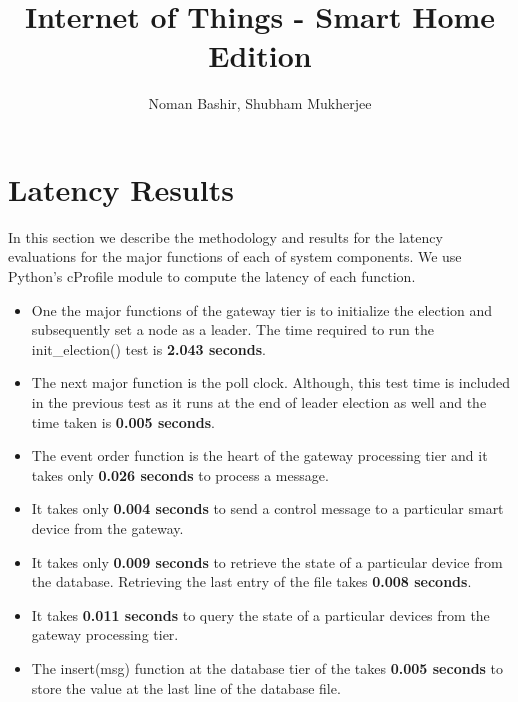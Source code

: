 \documentclass[12pt]{article}
\begin{document}
 
\title{Internet of Things - Smart Home Edition}%
\author{Noman Bashir, Shubham Mukherjee}
\maketitle

\section{Latency Results}
In this section we describe the methodology and results for the latency evaluations
for the major functions of each of system components. We use Python's cProfile 
module to compute the latency of each function. 

\begin{itemize}
	\item One the major functions of the 
	gateway tier is to initialize the election and subsequently set a node as a leader. The 
	time required to  run the init\_election() test is \textbf{2.043 seconds}. 
	
	\item The next major function is the poll clock. Although, this test time is included in the previous test as it runs at the end of leader election as well and the time taken is \textbf{0.005 seconds}.
	
	\item The event order function is the heart of the gateway processing tier and it takes only \textbf{0.026 seconds} to process a message. 
	
	\item It takes only \textbf{0.004 seconds} to send a control message to a particular smart device from the gateway. 
	
	\item It takes only \textbf{0.009 seconds} to retrieve the state of a particular device from the 
	database. Retrieving the last entry of the file takes \textbf{0.008 seconds}.
	
	\item It takes \textbf{0.011 seconds} to query the state of a particular devices from the gateway processing tier.
	
	\item The insert(msg) function at the database tier of the takes \textbf{0.005 seconds} to store the value at the last line of the database file. 
	
\end{itemize}
\end{document}
